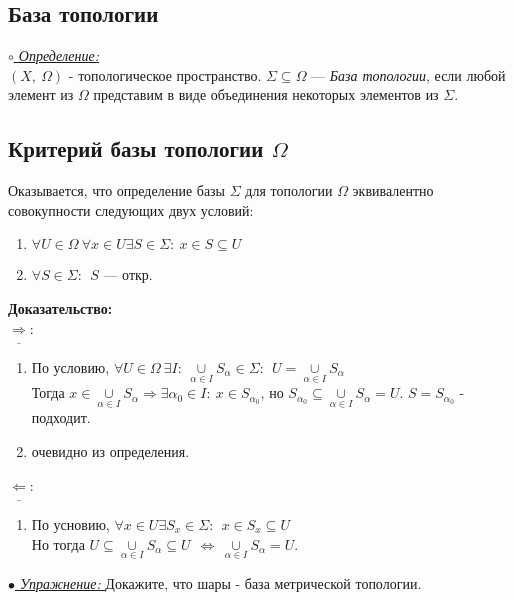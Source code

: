 \documentclass{article}
\begin{document}
\begin{spacing}{1.5}
\section{База топологии}
\underline{\textit{$\circ$ Определение:}}\\
$(X,~\Omega)$ - топологическое пространство.
$\Sigma\subseteq\Omega$ --- \emph{База топологии}, если любой элемент из $\Omega$ представим в виде объединения некоторых элементов из $\Sigma$.
\subsection{Критерий базы топологии $\Omega$}
Оказывается, что определение базы $\Sigma$ для топологии $\Omega$ эквивалентно совокупности следующих двух условий:
\begin{enumerate}
\item $\forall U\in\Omega~\forall x\in U \exists S\in \Sigma:~x\in S\subseteq U$
\item $\forall S\in \Sigma:~~ S$ --- откр.
\end{enumerate}
\textbf{Доказательство:}\\
$\underline{\Rightarrow}$: 
\begin{enumerate}
\item По условию, $\forall U\in \Omega~\exists I:~\underset{\alpha\in I}{\cup}S_{\alpha}\in \Sigma:~~U=\underset{\alpha\in I}{\cup}S_{\alpha}$
\\ Тогда $x\in \underset{\alpha\in I}{\cup}S_{\alpha}\Longrightarrow \exists\alpha_{0}\in I:~x\in S_{\alpha_{0}}$, но $S_{\alpha_{0}}\subseteq\underset{\alpha\in I}{\cup}S_{\alpha}=U$. $S = S_{\alpha_{0}}$ - подходит.
\item очевидно из определения.
\end{enumerate}
$\underline{\Leftarrow}$: \begin{enumerate}
\item[]По усновию, $\forall x\in U \exists S_{x}\in\Sigma:~~x\in S_{x}\subseteq U$
\\Но тогда $U\subseteq\underset{\alpha\in I}{\cup}S_{\alpha}\subseteq U~~\Longleftrightarrow~\underset{\alpha\in I}{\cup}S_{\alpha}=U$.
\end{enumerate}
 \underline{\emph{$\bullet$ Упражнение: }} Докажите, что шары - база метрической топологии.

\end{spacing}
\end{document}
